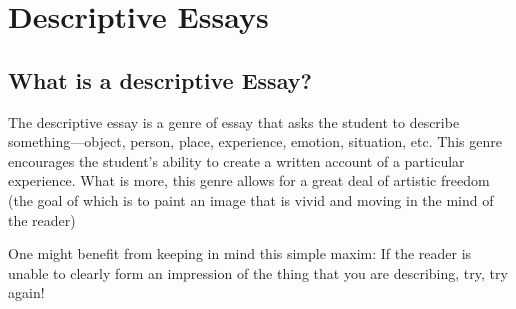 \chapter{Descriptive Essays}

\section{What is a descriptive Essay?}
	The descriptive essay is a genre of essay that asks the student to describe something—object, person, place, experience, emotion, situation, etc. This genre encourages the student’s ability to create a written account of a particular experience. What is more, this genre allows for a great deal of artistic freedom (the goal of which is to paint an image that is vivid and moving in the mind of the reader)
	
	One might benefit from keeping in mind this simple maxim: If the reader is unable to clearly form an impression of the thing that you are describing, try, try again!

